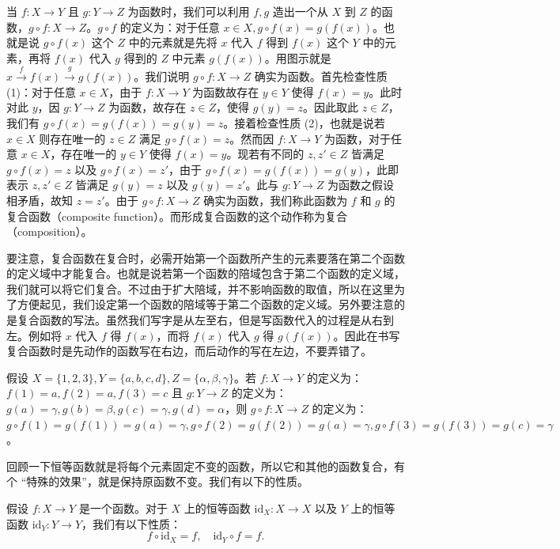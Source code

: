 当 $f : X \to Y$ 且 $g : Y \to Z$ 为函数时，我们可以利用 $f, g$ 造出一个从 $X$ 到 $Z$ 的函数，$g \circ f : X \to Z$。$g \circ f$ 的定义为：对于任意 $x \in X, g \circ f(x) = g(f(x))$。也就是说 $g \circ f(x)$ 这个 $Z$ 中的元素就是先将 $x$ 代入 $f$ 得到 $f(x)$ 这个 $Y$ 中的元素，再将 $f(x)$ 代入 $g$ 得到的 $Z$ 中元素 $g(f(x))$。用图示就是 $x \xrightarrow{f} f(x) \xrightarrow{g} g(f(x))$。我们说明 $g \circ f : X \to Z$ 确实为函数。首先检查性质 (1)：对于任意 $x \in X$，由于 $f : X \to Y$ 为函数故存在 $y \in Y$ 使得 $f(x) = y$。此时对此 $y$，因 $g : Y \to Z$ 为函数，故存在 $z \in Z$，使得 $g(y) = z$。因此取此 $z \in Z$，我们有 $g \circ f(x) = g(f(x)) = g(y) = z$。接着检查性质 (2)，也就是说若 $x \in X$ 则存在唯一的 $z \in Z$ 满足 $g \circ f(x) = z$。然而因 $f : X \to Y$ 为函数，对于任意 $x \in X$，存在唯一的 $y \in Y$ 使得 $f(x) = y$。现若有不同的 $z, z' \in Z$ 皆满足 $g \circ f(x) = z$ 以及 $g \circ f(x) = z'$，由于 $g \circ f(x) = g(f(x)) = g(y)$，此即表示 $z, z' \in Z$ 皆满足 $g(y) = z$ 以及 $g(y) = z'$。此与 $g : Y \to Z$ 为函数之假设相矛盾，故知 $z = z'$。由于 $g \circ f : X \to Z$ 确实为函数，我们称此函数为 $f$ 和 $g$ 的复合函数（composite function）。而形成复合函数的这个动作称为复合（composition）。

要注意，复合函数在复合时，必需开始第一个函数所产生的元素要落在第二个函数的定义域中才能复合。也就是说若第一个函数的陪域包含于第二个函数的定义域，我们就可以将它们复合。不过由于扩大陪域，并不影响函数的取值，所以在这里为了方便起见，我们设定第一个函数的陪域等于第二个函数的定义域。另外要注意的是复合函数的写法。虽然我们写字是从左至右，但是写函数代入的过程是从右到左。例如将 $x$ 代入 $f$ 得 $f(x)$，而将 $f(x)$ 代入 $g$ 得 $g(f(x))$。因此在书写复合函数时是先动作的函数写在右边，而后动作的写在左边，不要弄错了。

\begin{example}
假设 $X = \{1, 2, 3\}, Y = \{a, b, c, d\}, Z = \{\alpha, \beta, \gamma\}$。若 $f : X \to Y$ 的定义为：$f(1) = a, f(2) = a, f(3) = c$ 且 $g : Y \to Z$ 的定义为：$g(a) = \gamma, g(b) = \beta, g(c) = \gamma, g(d) = \alpha$，则 $g \circ f : X \to Z$ 的定义为：$g \circ f(1) = g(f(1)) = g(a) = \gamma, g \circ f(2) = g(f(2)) = g(a) = \gamma, g \circ f(3) = g(f(3)) = g(c) = \gamma$。
\end{example}

回顾一下恒等函数就是将每个元素固定不变的函数，所以它和其他的函数复合，有个 “特殊的效果”，就是保持原函数不变。我们有以下的性质。

\begin{lemma}
假设 $f : X \to Y$ 是一个函数。对于 $X$ 上的恒等函数 $\mathrm{id}_X : X \to X$ 以及 $Y$ 上的恒等函数 $\mathrm{id}_Y : Y \to Y$，我们有以下性质：
$$ f \circ \mathrm{id}_X = f, \quad \mathrm{id}_Y \circ f = f. $$
\end{lemma}

